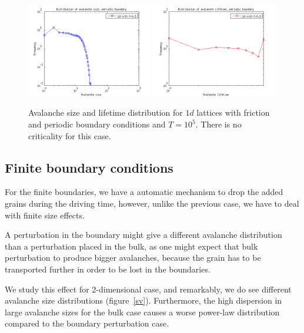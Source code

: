 \begin{figure} 
\begin{center}
\includegraphics[width=0.49\textwidth]{results/1sp.png}
\includegraphics[width=0.49\textwidth]{results/1tp.png} 
\caption{Avalanche size and lifetime distribution for $1d$ lattices with friction and periodic boundary conditions and $T=10^5$. There is no criticality for this case. }
\label{1p}
\end{center}
\end{figure} 










\subsection{Finite boundary conditions}

For the finite boundaries, we have a automatic mechanism to drop the added grains during the driving time, however, unlike the previous case, we have to deal with finite size effects. 

A perturbation in the boundary might give a different avalanche distribution than a perturbation placed in the bulk,
as one might expect that bulk perturbation to produce bigger avalanches, 
because the grain has to be transported further in order to be lost in the boundaries.

We study this effect for 2-dimensional case, and remarkably, we do see different avalanche size distributions (figure~\ref{sv}). 
Furthermore, the high dispersion in large avalanche sizes for the bulk case causes a worse power-law distribution compared to the boundary perturbation case.

